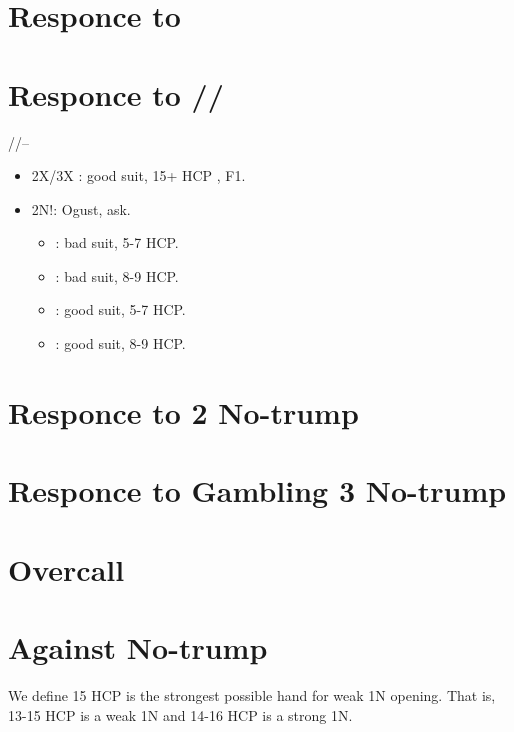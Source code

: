 \documentclass[12pt,twoside,a5paper]{report}%
\begin{document}
\chapter*{Responce to }
\chapter*{Responce to /\he{}/\sp{}}
	//-- \\
	\begin{itemize}
	\renewcommand{\labelitemi}{}	
	\item 2X/3X : good suit, 15+ HCP , F1.
	\item 2N!: Ogust, ask.
		\begin{itemize}
		\renewcommand{\labelitemi}{--}
			\item {} : bad suit, 5-7 HCP.
			\item {} : bad suit, 8-9 HCP.
			\item {} : good suit, 5-7 HCP.
			\item {} : good suit, 8-9 HCP.
		\end{itemize}
	\end{itemize}
\chapter*{Responce to 2 No-trump}
\chapter*{Responce to Gambling 3 No-trump}
\chapter*{Overcall}
\chapter*{Against No-trump}
	We define 15 HCP is the strongest possible hand for weak 1N opening. That is, 13-15 HCP is a weak 1N and 14-16 HCP is a strong 1N. 
\end{document}
